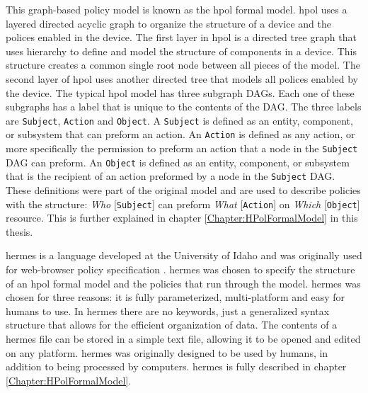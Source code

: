 \documentclass[12pt,letterpaper]{report}
\begin{document}

This graph-based policy model is known as the \ac{hpol} formal model. \ac{hpol} uses a layered directed acyclic graph to organize the structure of a device and the polices enabled in the device. The first layer in \ac{hpol} is a directed tree graph that uses hierarchy to define and model the structure of components in a device. This structure creates a common single root node between all pieces of the model. The second layer of \ac{hpol} uses another directed tree that models all polices enabled by the device. The typical \ac{hpol} model has three subgraph DAGs. Each one of these subgraphs has a label that is unique to the contents of the DAG. The three labels are \texttt{Subject}, \texttt{Action} and \texttt{Object}. A \texttt{Subject} is defined as an entity, component, or subsystem that can preform an action. An \texttt{Action} is defined as any action, or more specifically the permission to preform an action that a node in the \texttt{Subject} DAG can preform. An \texttt{Object} is defined as an entity, component, or subsystem that is the recipient of an action preformed by a node in the \texttt{Subject} DAG. These definitions were part of the original model and are used to describe policies with the structure: \textit{Who} [\texttt{Subject}] can preform \textit{What} [\texttt{Action}] on \textit{Which} [\texttt{Object}] resource. This is further explained in chapter \ref{Chapter:HPolFormalModel} in this thesis.

\ac{hermes} is a language developed at the University of Idaho and was originally used for web-browser policy specification \cite{hifipolbro}. \ac{hermes} was chosen to specify the structure of an \ac{hpol} formal model and the policies that run through the model. \ac{hermes} was chosen for three reasons: it is fully parameterized, multi-platform and easy for humans to use. In \ac{hermes} there are no keywords, just a generalized syntax structure that allows for the efficient organization of data. The contents of a \ac{hermes} file can be stored in a simple text file, allowing it to be opened and edited on any platform. \ac{hermes} was originally designed to be used by humans, in addition to being processed by computers. \ac{hermes} is fully described in chapter \ref{Chapter:HPolFormalModel}.
\end{document}
